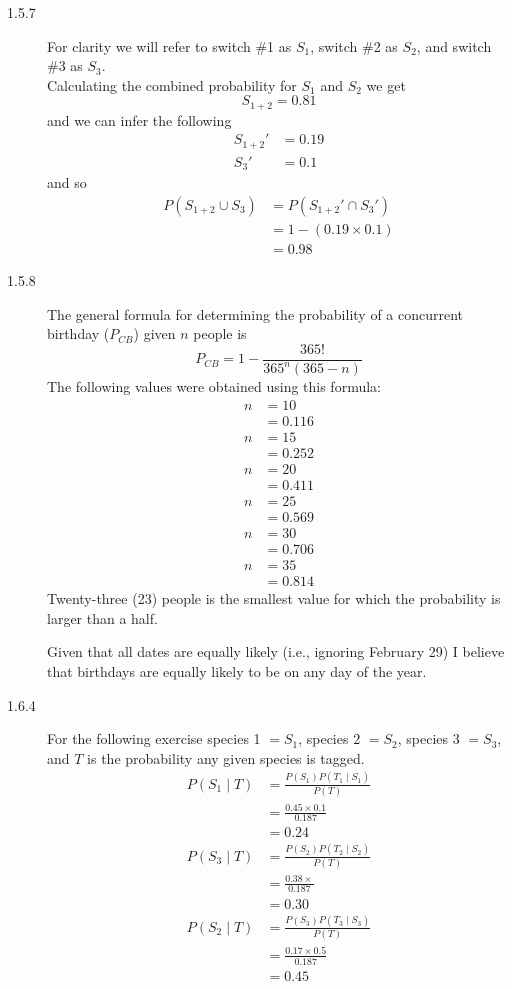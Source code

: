\documentclass[letterpaper,10pt]{article}
\begin{document}
\begin{description}
\item[1.5.7]
For clarity we will refer to switch \#1 as $S_{1}$, switch \#2 as $S_{2}$, and switch \#3 as $S_{3}$. \\ Calculating the combined probability for $S_{1}$ and $S_{2}$ we get $$S_{1+2} = 0.81$$ and we can infer the following
\begin{align*}
S_{1+2}' &= 0.19 \\
S_{3}' &= 0.1
\end{align*}
and so 
\begin{align*}
P(S_{1+2}\cup S_{3}) &= P(S_{1+2}'\cap S_{3}') \\
&= 1 - (0.19\times 0.1) \\
&= 0.98
\end{align*}

\item[1.5.8]
The general formula for determining the probability of a concurrent birthday ($P_{CB}$) given $n$ people is
$$P_{CB} = 1 - \frac{365!}{365^{n}(365 - n)}$$
The following values were obtained using this formula:
\begin{align*}
n &= 10 \\
&= 0.116 \\
n &= 15 \\
&= 0.252 \\
n &= 20 \\
&= 0.411 \\
n &= 25 \\
&= 0.569 \\
n &= 30 \\
&= 0.706 \\
n &= 35 \\
&= 0.814
\end{align*}
Twenty-three (23) people is the smallest value for which the probability is larger than a half.
\par Given that all dates are equally likely (i.e., ignoring February 29) I believe that birthdays are equally likely to be on any day of the year.

\item[1.6.4]
For the following exercise species 1 $= S_{1}$, species 2 $= S_{2}$, species 3 $= S_{3}$, and $T$ is the probability any given species is tagged.
\begin{align*}
P(S_{1}\mid T) &= \frac{P(S_{1}) P(T_{1}\mid S_{1})}{P(T)} \\
&= \frac{0.45\times 0.1}{0.187} \\
&= 0.24 \\
P(S_{3}\mid T) &= \frac{P(S_{2}) P(T_{2}\mid S_{2})}{P(T)} \\
&= \frac{0.38\times }{0.187} \\
&= 0.30 \\
P(S_{2}\mid T) &= \frac{P(S_{3}) P(T_{3}\mid S_{3})}{P(T)} \\
&= \frac{0.17\times 0.5}{0.187} \\
&= 0.45
\end{align*}


\end{description}
\end{document}
